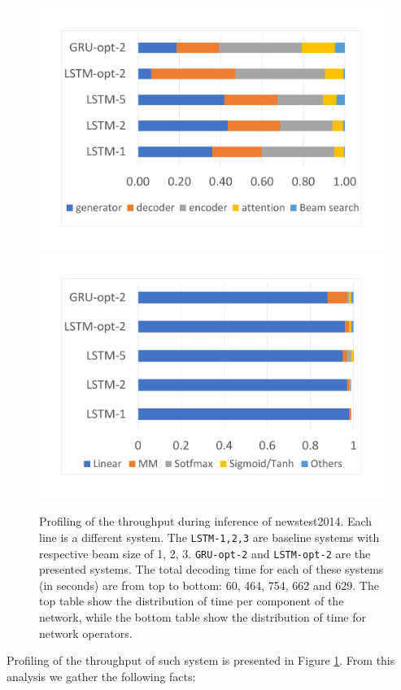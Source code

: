 \documentclass[11pt,a4paper]{article}
\begin{document}
\begin{figure}
\includegraphics[width=\linewidth]{decoder.pdf}
\includegraphics[width=\linewidth]{decoder_linear.pdf}
\caption{Profiling of the throughput during inference of newstest2014. Each line is a different system. The {\tt LSTM-1,2,3} are baseline systems with respective beam size of 1, 2, 3. {\tt GRU-opt-2} and {\tt LSTM-opt-2} are the presented systems. The total decoding time for each of these systems (in seconds) are from top to bottom: 60, 464, 754, 662 and 629. The top table show the distribution of time per component of the network, while the bottom table show the distribution of time for network operators.}
\label{fig:decoding_cost}
\end{figure}

Profiling of the throughput of such system is presented in Figure \ref{fig:decoding_cost}. From this analysis we gather the following facts:
\end{document}
